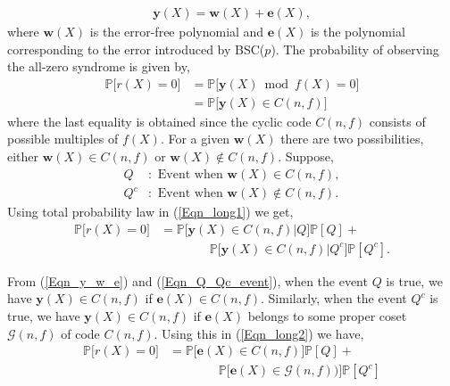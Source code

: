 \documentclass[10pt,journal]{IEEEtran}
\begin{document}
\begin{align}
%  
\mathbf{y}(X) = \mathbf{w}(X) + \mathbf{e}(X),
\label{Eqn_y_w_e}
% 
\end{align}
% 
where $\mathbf{w}(X)$ is the error-free polynomial and $\mathbf{e}(X)$ is the polynomial corresponding to the error introduced
by BSC($p$). The probability of observing the all-zero syndrome is given by,
\begin{equation}
%  
\begin{aligned}
%  
\mathbb{P}\Big[r(X) = 0\Big] &= \mathbb{P}\Big[\mathbf{y}(X) \bmod f(X) = 0\Big] \\
&= \mathbb{P}\Big[\mathbf{y}(X) \in C(n,f)\Big]
% 
\end{aligned}
% 
\label{Eqn_long1}
% 
\end{equation}
% 
where the last equality is obtained since the cyclic code $C(n,f)$ consists of possible
multiples of $f(X)$. 
For a given $\mathbf{w}(X)$ there are two possibilities, either 
$\mathbf{w}(X) \in C(n,f)$ or $\mathbf{w}(X) \notin C(n,f)$.
Suppose,
% 
\begin{equation}
% 
\begin{aligned}
%  
Q &: \mbox{ Event when } \mathbf{w}(X) \in C(n,f), \\
Q^c &: \mbox{ Event when } \mathbf{w}(X) \notin C(n,f).
% 
\end{aligned}
% 
\label{Eqn_Q_Qc_event}
% 
\end{equation}
% 
Using total probability law in (\ref{Eqn_long1}) we get,
%  
\begin{align}
%  
\mathbb{P}\Big[r(X) = 0\Big] & = \mathbb{P}\Big[\mathbf{y}(X) \in C(n,f) \Big| Q \Big] \mathbb{P}[Q] + \nonumber \\
&\mbox{~~~~~~~~~~~~}\mathbb{P}\Big[\mathbf{y}(X) \in C(n,f) \Big| Q^c \Big] \mathbb{P}[Q^c].
\label{Eqn_long2}
% 
\end{align}
% 

From (\ref{Eqn_y_w_e}) and (\ref{Eqn_Q_Qc_event}), when the event $Q$ is true, we have $\mathbf{y}(X) \in C(n,f)$ if $\mathbf{e}(X) \in C(n,f)$.
Similarly, when the event $Q^c$ is true, we have $\mathbf{y}(X) \in C(n,f)$ if $\mathbf{e}(X)$
belongs to some proper coset $\mathcal{G}(n,f)$ of code $C(n,f)$.
Using this in (\ref{Eqn_long2}) we have,
%  
\begin{align}
%  
\mathbb{P}\Big[r(X) = 0\Big] &= \mathbb{P} \Big[\mathbf{e}(X) \in C(n,f) \Big] \mathbb{P}[Q] + \nonumber \\
&\mbox{~~~~~~~~~~~~} \mathbb{P} \Big[ \mathbf{e}(X) \in \mathcal{G}(n,f)) \Big] \mathbb{P}[Q^c]
\label{Eqn_long3}
% 
\end{align}
% 
\end{document}
